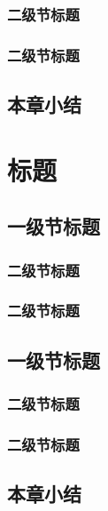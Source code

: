 \documentclass{swjtuthesis}
\begin{document}
\subsection{二级节标题}
\subsection{二级节标题}
\section{本章小结}

\chapter{标题}
\section{一级节标题}
\subsection{二级节标题}
\subsection{二级节标题}
\section{一级节标题}
\subsection{二级节标题}
\subsection{二级节标题}
\section{本章小结}

\makebackmatter
\end{document}

